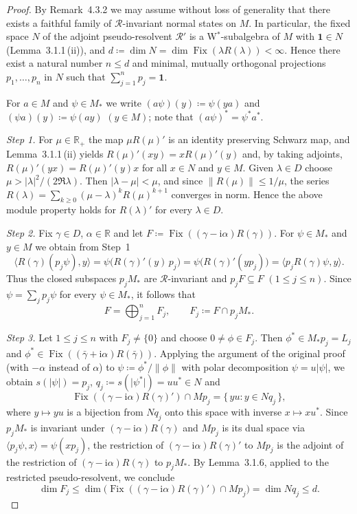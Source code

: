 \documentclass[11pt,a4paper]{article}
\theoremstyle{remark}
\newcommand{\R}{\mathbb{R}}
\newcommand{\im}{\mathrm{i}}
\newcommand{\1}{\mathbf{1}}
\newcommand{\RR}{\mathcal{R}}
\newcommand{\Fix}[1]{\operatorname{Fix}(#1)}
\newcommand{\abs}[1]{\lvert #1\rvert}
\newcommand{\WA}{W$^{*}$}
\begin{document}
\begin{proof}
By Remark~4.3.2 we may assume without loss of generality that there exists a faithful family of\/ $\RR$-invariant normal states on $M$.
In particular, the fixed space $N$ of the adjoint pseudo-resolvent $\RR'$ is a \WA-subalgebra of\/ $M$ with $\1 \in N$ (Lemma~3.1.1\,(ii)), and $d \coloneqq \dim N = \dim \Fix{\lambda R(\lambda)} < \infty$.
Hence there exist a natural number $n \le d$ and minimal, mutually orthogonal projections $p_1, \dots, p_n$ in $N$ such that $\sum_{j=1}^{n} p_j = \1$.

For $a \in M$ and $\psi \in M_*$ we write $(a\psi)(y) \coloneqq \psi(ya)$ and $(\psi a)(y) \coloneqq \psi(ay)$ $(y \in M)$; note that $(a\psi)^{*} = \psi^{*}a^{*}$.

\emph{Step 1.}
For $\mu \in \R_{+}$ the map $\mu R(\mu)'$ is an identity preserving Schwarz map, and Lemma~3.1.1\,(ii) yields
$R(\mu)'(xy) = xR(\mu)'(y)$ and, by taking adjoints, $R(\mu)'(yx) = R(\mu)'(y)x$ for all $x \in N$ and $y \in M$.
Given $\lambda \in D$ choose $\mu > \abs{\lambda}^{2}/(2\Re\lambda)$.
Then $\abs{\lambda - \mu} < \mu$, and since $\|R(\mu)\| \le 1/\mu$, the series $R(\lambda) = \sum_{k \ge 0} (\mu - \lambda)^{k} R(\mu)^{k+1}$ converges in norm.
Hence the above module property holds for $R(\lambda)'$ for every $\lambda \in D$.

\emph{Step 2.}
Fix $\gamma \in D$, $\alpha \in \R$ and let $F \coloneqq \Fix{(\gamma - \im\alpha)R(\gamma)}$.
For $\psi \in M_*$ and $y \in M$ we obtain from Step~1
\[
  \langle R(\gamma)(p_j\psi), y\rangle = \psi\bigl(R(\gamma)'(y)\,p_j\bigr) = \psi\bigl(R(\gamma)'(yp_j)\bigr) = \langle p_jR(\gamma)\psi, y\rangle .
\]
Thus the closed subspaces $p_jM_*$ are $\RR$-invariant and $p_jF \subseteq F$ $(1 \le j \le n)$.
Since $\psi = \sum_{j} p_j\psi$ for every $\psi \in M_*$, it follows that
\[
  F = \bigoplus_{j=1}^{n} F_j , \qquad F_j \coloneqq F \cap p_jM_* .
\]

\emph{Step 3.}
Let $1 \le j \le n$ with $F_j \ne \{0\}$ and choose $0 \ne \phi \in F_j$.
Then $\phi^{*} \in M_*p_j = L_j$ and $\phi^{*} \in \Fix{(\bar\gamma + \im\alpha)R(\bar\gamma)}$.
Applying the argument of the original proof (with $-\alpha$ instead of\/ $\alpha$) to $\psi \coloneqq \phi^{*}/\|\phi\|$ with polar decomposition $\psi = u\abs{\psi}$, we obtain $s(\abs{\psi}) = p_j$, $q_j \coloneqq s(\abs{\psi^{*}}) = uu^{*} \in N$ and
\[
  \Fix{(\gamma - \im\alpha)R(\gamma)'} \cap Mp_j = \{\, yu \colon y \in Nq_j \,\},
\]
where $y \mapsto yu$ is a bijection from $Nq_j$ onto this space with inverse $x \mapsto xu^{*}$.
Since $p_jM_*$ is invariant under $(\gamma - \im\alpha)R(\gamma)$ and $Mp_j$ is its dual space via $\langle p_j\psi, x\rangle = \psi(xp_j)$, the restriction of\/ $(\gamma - \im\alpha)R(\gamma)'$ to $Mp_j$ is the adjoint of the restriction of\/ $(\gamma - \im\alpha)R(\gamma)$ to $p_jM_*$.
By Lemma~3.1.6, applied to the restricted pseudo-resolvent, we conclude
\[
  \dim F_j \le \dim \bigl(\Fix{(\gamma - \im\alpha)R(\gamma)'} \cap Mp_j\bigr) = \dim Nq_j \le d .
\]


\end{proof}
\end{document}
